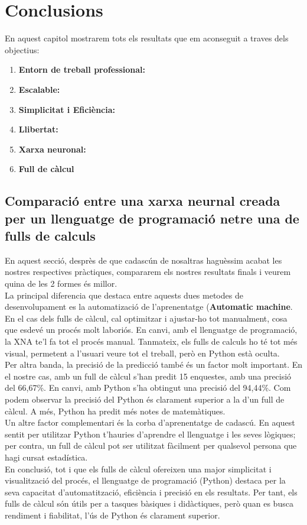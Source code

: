 \chapter{Conclusions}
\label{c:conclusions}
En aquest capitol mostrarem tots els resultats que em aconseguit a traves dels objectius:
\begin{enumerate}
     \item \textbf{Entorn de treball professional: }
     \item \textbf{Escalable: }
     \item \textbf{Simplicitat i Eficiència: }
     \item \textbf{Llibertat: }
     \item \textbf{Xarxa neuronal: }
     \item \textbf{Full de càlcul}
\end{enumerate}

\section{Comparació entre una xarxa neurnal creada per un llenguatge de programació netre una de fulls de calculs}
En aquest secció, desprès de que cadascún de nosaltras haguèssim acabat les nostres respectives pràctiques, compararem els nostres resultats finals i veurem quina de les 2 formes és millor.\\

La principal diferencia que destaca entre aquests dues metodes de desenvolupament es la automatizació de l'aprenentatge (\textbf{Automatic machine}. En el cas dels fulls de càlcul, cal optimitzar i ajustar-ho tot manualment, cosa que esdevé un procés molt laboriós. En canvi, amb el llenguatge de programació, la XNA te'l fa tot el procés manual. Tanmateix, els fulls de calculs ho té tot més visual, permetent a l'usuari veure tot el treball, però en Python està oculta.\\

Per altra banda, la precisió de la predicció també és un factor molt important. En el nostre cas, amb un full de càlcul s’han predit 15 enquestes, amb una precisió del 66,67\%. En canvi, amb Python s’ha obtingut una precisió del 94,44\%. Com podem observar la precisió del Python és clarament superior a la d'un full de càlcul. A més, Python ha predit més notes de matemàtiques.\\

Un altre factor complementari és la corba d'aprenentatge de cadascú. En aquest sentit per utilitzar Python t'hauries d'aprendre el llenguatge i les seves lògiques; per contra, un full de càlcul pot ser utilitzat fàcilment per qualsevol persona que hagi cursat estadística.\\

En conclusió, tot i que els fulls de càlcul ofereixen una major simplicitat i visualització del procés, el llenguatge de programació (Python) destaca per la seva capacitat d’automatització, eficiència i precisió en els resultats. Per tant, els fulls de càlcul són útils per a tasques bàsiques i didàctiques, però quan es busca rendiment i fiabilitat, l’ús de Python és clarament superior.
